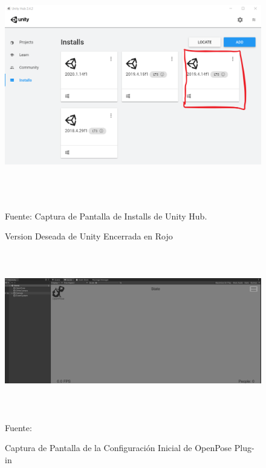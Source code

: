 \newpage
\begin{figure}[t!]
	\centering
	\includegraphics[width=14cm,height=10cm,]{./Images/installunity.png}
	\caption{Version Deseada de Unity Encerrada en Rojo}
	\footnotesize Fuente: Captura de Pantalla de Installs de Unity Hub.
	\label{installunity}
\end{figure}
\begin{figure}[t!]
	\centering
	\includegraphics[width=14cm,height=7cm,]{./Images/unitydemo.png}
	\caption{Captura de Pantalla de la Configuración Inicial de OpenPose Plug-in}
	\footnotesize Fuente: \cite{8765346}\cite{cao2017realtime}\cite{simon2017hand}\cite{wei2016cpm}
	\label{unitydemo}
\end{figure}

